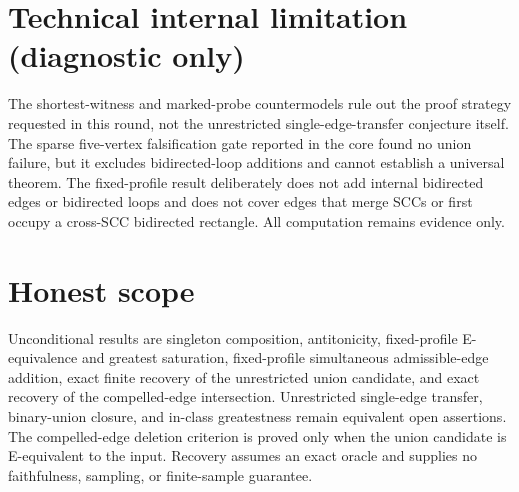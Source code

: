 \documentclass{article}
\begin{document}
\section*{Technical internal limitation (diagnostic only)}

The shortest-witness and marked-probe countermodels rule out the proof strategy requested in this round, not the unrestricted single-edge-transfer conjecture itself. The sparse five-vertex falsification gate reported in the core found no union failure, but it excludes bidirected-loop additions and cannot establish a universal theorem. The fixed-profile result deliberately does not add internal bidirected edges or bidirected loops and does not cover edges that merge SCCs or first occupy a cross-SCC bidirected rectangle. All computation remains evidence only.

\section{Honest scope}

Unconditional results are singleton composition, antitonicity, fixed-profile E-equivalence and greatest saturation, fixed-profile simultaneous admissible-edge addition, exact finite recovery of the unrestricted union candidate, and exact recovery of the compelled-edge intersection. Unrestricted single-edge transfer, binary-union closure, and in-class greatestness remain equivalent open assertions. The compelled-edge deletion criterion is proved only when the union candidate is E-equivalent to the input. Recovery assumes an exact oracle and supplies no faithfulness, sampling, or finite-sample guarantee.
\end{document}
